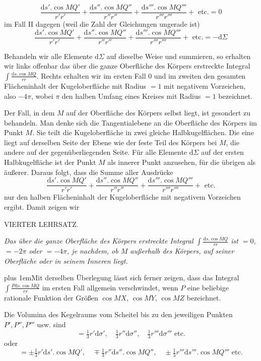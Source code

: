 \[
\frac{\mathrm{d}s'.\cos MQ'}{r'r'}+\frac{\mathrm{d}s''.\cos MQ''}{r''r''}+\frac{\mathrm{d}s'''.\cos MQ'''}{r'''r'''}+\text{ etc.}=0
\]
im Fall II dagegen (weil die Zahl der Gleichungen ungerade ist)
\[
\frac{\mathrm{d}s'.\cos MQ'}{r'r'}+\frac{\mathrm{d}s''.\cos MQ''}{r''r''}+\frac{\mathrm{d}s'''.\cos MQ'''}{r'''r'''}+\text{ etc.}=-\mathrm{d}\Sigma
\]
\par
Behandeln wir alle Elemente $\mathrm{d}\Sigma$ auf dieselbe Weise und summieren, so erhalten wir links offenbar das über die ganze Oberfläche des Körpers erstreckte Integral $\int\frac{\mathrm{d}s.\cos MQ}{rr}$. Rechts erhalten wir im ersten Fall $0$ und im zweiten den gesamten Flächeninhalt der Kugeloberfläche mit Radius $=1$ mit negativem Vorzeichen, also $-4\pi$, wobei $\pi$ den halben Umfang eines Kreises mit Radius $=1$ bezeichnet.

Der Fall, in dem $M$ auf der Oberfläche des Körpers selbst liegt, ist gesondert zu behandeln. Man denke sich die Tangentialebene an die Oberfläche des Körpers im Punkt $M$. Sie teilt die Kugeloberfläche in zwei gleiche Halbkugelflächen. Die eine liegt auf derselben Seite der Ebene wie der feste Teil des Körpers bei $M$, die andere auf der gegenüberliegenden Seite. Für alle Elemente $\mathrm{d}\Sigma$ auf der ersten Halbkugelfläche ist der Punkt $M$ als innerer Punkt anzusehen, für die übrigen als äußerer. Daraus folgt, dass die Summe aller Ausdrücke
\[
\frac{\mathrm{d}s'.\cos MQ'}{r'r'}+\frac{\mathrm{d}s''.\cos MQ''}{r''r''}+\frac{\mathrm{d}s'''.\cos MQ'''}{r'''r'''}+\text{ etc.}
\]
nur den halben Flächeninhalt der Kugeloberfläche mit negativem Vorzeichen ergibt. Damit zeigen wir
\par\medskip{}
\begin{center}VIERTER LEHRSATZ.\end{center}
\par
\textit{Das über die ganze Oberfläche des Körpers erstreckte Integral $\int\frac{\mathrm{d}s.\cos MQ}{rr}$ ist $=0$, $=-2\pi$ oder $=-4\pi$, je nachdem, ob $M$ außerhalb des Körpers, auf seiner Oberfläche oder in seinem Inneren liegt.}
\par
{\rightskip=0pt plus 1em\noindent\hspace*{\parindent}Mit derselben Überlegung lässt sich ferner zeigen, dass das Integral $\int\frac{P\mathrm{d}s.\cos MQ}{rr}$ im ersten Fall allgemein verschwindet, wenn $P$ eine beliebige rationale Funktion der Größen $\cos MX$, $\cos MY$, $\cos MZ$ bezeichnet.\par}

\par
Die Volumina des Kegelraums vom Scheitel bis zu den jeweiligen Punkten $P',P'',P'''$ usw. sind
\[
=\tfrac13r'\mathrm{d}\sigma',\quad\tfrac13r''\mathrm{d}\sigma'',\quad\tfrac13r'''\mathrm{d}\sigma'''\text{ etc.}
\]
oder
\[
=\pm\tfrac13r'\mathrm{d}s'.\cos MQ',\quad\mp\tfrac13r''\mathrm{d}s''.\cos MQ'',\quad\pm\tfrac13r'''\mathrm{d}s'''.\cos MQ'''\text{ etc.}
\]
